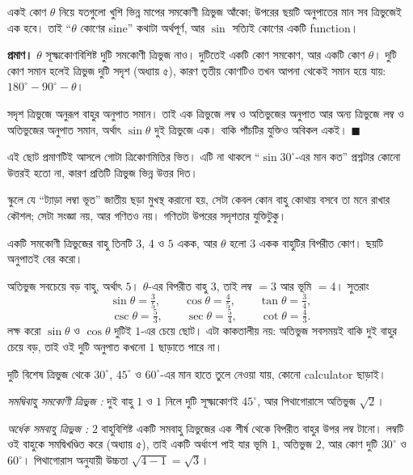 \documentclass[11pt]{article}
\begin{document}
\begin{idea}[অনুপাতগুলো ত্রিভুজের উপর নির্ভর করে না]
একই কোণ $\theta$ নিয়ে যতগুলো খুশি ভিন্ন মাপের সমকোণী ত্রিভুজ আঁকো; উপরের ছয়টি
অনুপাতের মান সব ত্রিভুজেই এক হবে। তাই ``$\theta$ কোণের sine'' কথাটা অর্থপূর্ণ,
আর $\sin$ সত্যিই কোণের একটি function।
\end{idea}

\noindent
\textbf{প্রমাণ।} $\theta$ সূক্ষ্মকোণবিশিষ্ট দুটি সমকোণী ত্রিভুজ নাও। দুটিতেই
একটি কোণ সমকোণ, আর একটি কোণ $\theta$। দুটি কোণ সমান হলেই ত্রিভুজ দুটি সদৃশ
(অধ্যায় ৫), কারণ তৃতীয় কোণটিও তখন আপনা থেকেই সমান হয়ে যায়:
$180^\circ - 90^\circ - \theta$।

সদৃশ ত্রিভুজে অনুরূপ বাহুর অনুপাত সমান। তাই এক ত্রিভুজে লম্ব ও অতিভুজের অনুপাত
আর অন্য ত্রিভুজে লম্ব ও অতিভুজের অনুপাত সমান, অর্থাৎ $\sin\theta$ দুই ত্রিভুজে
এক। বাকি পাঁচটির যুক্তিও অবিকল একই। $\blacksquare$

\begin{remark}
এই ছোট প্রমাণটিই আসলে গোটা ত্রিকোণমিতির ভিত। এটি না থাকলে ``$\sin 30^\circ$-এর
মান কত'' প্রশ্নটার কোনো উত্তরই হতো না, কারণ প্রতিটি ত্রিভুজ ভিন্ন উত্তর দিত।

স্কুলে যে ``ট্যাড়া লম্বা ভূত'' জাতীয় ছড়া মুখস্থ করানো হয়, সেটা কেবল কোন বাহু কোথায় বসবে
তা মনে রাখার কৌশল; সেটা সংজ্ঞা নয়, আর গণিতও নয়। গণিতটা উপরের সদৃশতার যুক্তিটুকু।
\end{remark}

\begin{example}
একটি সমকোণী ত্রিভুজের বাহু তিনটি $3$, $4$ ও $5$ একক, আর $\theta$ হলো $3$ একক
বাহুটির বিপরীত কোণ। ছয়টি অনুপাতই বের করো।
\end{example}

\begin{solbox}
অতিভুজ সবচেয়ে বড় বাহু, অর্থাৎ $5$। $\theta$-এর বিপরীত বাহু $3$, তাই লম্ব $= 3$
আর ভূমি $= 4$। সুতরাং
\[
  \sin\theta = \tfrac{3}{5}, \qquad
  \cos\theta = \tfrac{4}{5}, \qquad
  \tan\theta = \tfrac{3}{4},
\]
\[
  \csc\theta = \tfrac{5}{3}, \qquad
  \sec\theta = \tfrac{5}{4}, \qquad
  \cot\theta = \tfrac{4}{3} .
\]
লক্ষ করো $\sin\theta$ ও $\cos\theta$ দুটিই $1$-এর চেয়ে ছোট। এটা কাকতালীয় নয়:
অতিভুজ সবসময়ই বাকি দুই বাহুর চেয়ে বড়, তাই ওই দুটি অনুপাত কখনো $1$ ছাড়াতে
পারে না।
\end{solbox}

\begin{idea}[বিশেষ কোণের সঠিক মান]
দুটি বিশেষ ত্রিভুজ থেকে $30^\circ$, $45^\circ$ ও $60^\circ$-এর মান হাতে তুলে
নেওয়া যায়, কোনো calculator ছাড়াই।

\emph{সমদ্বিবাহু সমকোণী ত্রিভুজ :} দুই বাহু $1$ ও $1$ নিলে দুটি সূক্ষ্মকোণই
$45^\circ$, আর পিথাগোরাসে অতিভুজ $\sqrt{2}$।

\emph{অর্ধেক সমবাহু ত্রিভুজ :} $2$ বাহুবিশিষ্ট একটি সমবাহু ত্রিভুজের এক শীর্ষ
থেকে বিপরীত বাহুর উপর লম্ব টানো। লম্বটি ওই বাহুকে সমদ্বিখণ্ডিত করে
(অধ্যায় ৫), তাই একটি অর্ধাংশ পাই যার ভূমি $1$, অতিভুজ $2$, আর কোণ দুটি
$30^\circ$ ও $60^\circ$। পিথাগোরাস অনুযায়ী উচ্চতা $\sqrt{4-1} = \sqrt{3}$।
\end{idea}
\end{document}

